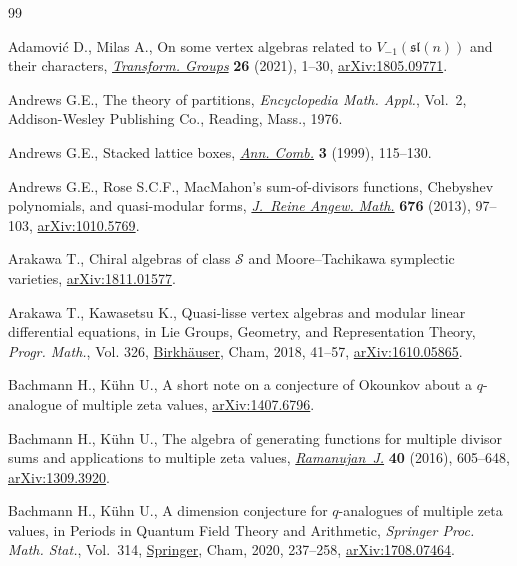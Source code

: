 \documentclass[pdftex]{sigma}
\numberwithin{equation}{section}
\theoremstyle{definition}
\begin{document}
\begin{thebibliography}{99}
\footnotesize\itemsep=0pt

Adamovi\'{c} D., Milas A., On some vertex algebras related to
 {$V_{-1}(\mathfrak{sl}(n))$} and their characters,
 \href{https://doi.org/10.1007/s00031-020-09617-w}{\textit{Transform. Groups}}
 \textbf{26} (2021), 1--30,
 \href{https://arxiv.org/abs/1805.09771}{arXiv:1805.09771}.

Andrews G.E., The theory of partitions, \textit{Encyclopedia Math. Appl.},
 Vol.~2, Addison-Wesley Publishing Co., Reading, Mass., 1976.

Andrews G.E., Stacked lattice boxes,
 \href{https://doi.org/10.1007/BF01608779}{\textit{Ann. Comb.}} \textbf{3}
 (1999), 115--130.

Andrews G.E., Rose S.C.F., Mac{M}ahon's sum-of-divisors functions, {C}hebyshev
 polynomials, and quasi-modular forms,
 \href{https://doi.org/10.1515/crelle.2011.179}{\textit{J.~Reine Angew.
 Math.}} \textbf{676} (2013), 97--103,
 \href{https://arxiv.org/abs/1010.5769}{arXiv:1010.5769}.

Arakawa T., Chiral algebras of class $\mathcal{S}$ and {M}oore--{T}achikawa
 symplectic varieties,
 \href{https://arxiv.org/abs/1811.01577}{arXiv:1811.01577}.

Arakawa T., Kawasetsu K., Quasi-lisse vertex algebras and modular linear
 differential equations, in Lie Groups, Geometry, and Representation Theory,
 \textit{Progr. Math.}, Vol. 326,
 \href{https://doi.org/10.1007/978-3-030-02191-7_2}{Birkh\"auser}, Cham, 2018,
 41--57, \href{https://arxiv.org/abs/1610.05865}{arXiv:1610.05865}.

Bachmann H., K\"uhn U., A short note on a conjecture of {O}kounkov about a
 $q$-analogue of multiple zeta values,
 \href{https://arxiv.org/abs/1407.6796}{arXiv:1407.6796}.

Bachmann H., K\"uhn U., The algebra of generating functions for multiple
 divisor sums and applications to multiple zeta values,
 \href{https://doi.org/10.1007/s11139-015-9707-7}{\textit{Ramanujan~J.}}
 \textbf{40} (2016), 605--648,
 \href{https://arxiv.org/abs/1309.3920}{arXiv:1309.3920}.

Bachmann H., K\"uhn U., A dimension conjecture for $q$-analogues of multiple
 zeta values, in Periods in Quantum Field Theory and Arithmetic,
 \textit{Springer Proc. Math. Stat.}, Vol.~314,
 \href{https://doi.org/10.1007/978-3-030-37031-2_9}{Springer}, Cham, 2020,
 237--258, \href{https://arxiv.org/abs/1708.07464}{arXiv:1708.07464}.


\end{thebibliography}
\end{document}
